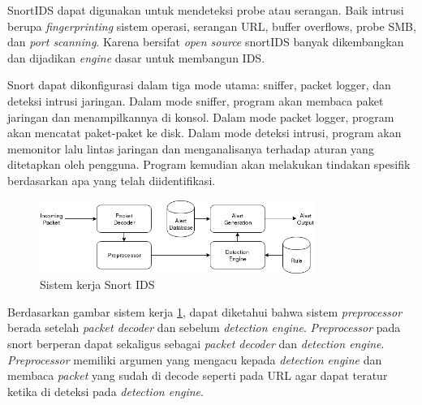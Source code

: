 \documentclass[./skripsi.tex]{subfiles}
\begin{document}
\par SnortIDS dapat digunakan untuk mendeteksi probe atau serangan. Baik intrusi berupa \textit{fingerprinting} sistem operasi,  serangan URL, buffer overflows, probe SMB, dan \textit{port scanning}. Karena bersifat \textit{open source} snortIDS banyak dikembangkan dan dijadikan \textit{engine} dasar untuk membangun IDS. \cite{stanger2011cheat}

\par Snort dapat dikonfigurasi dalam tiga mode utama: sniffer, packet logger, dan deteksi intrusi jaringan. Dalam mode sniffer, program akan membaca paket jaringan dan menampilkannya di konsol. Dalam mode packet logger, program akan mencatat paket-paket ke disk. Dalam mode deteksi intrusi, program akan memonitor lalu lintas jaringan dan menganalisanya terhadap aturan yang ditetapkan oleh pengguna. Program kemudian akan melakukan tindakan spesifik berdasarkan apa yang telah diidentifikasi.
\begin{figure}%
    \centering
    \includegraphics[width=0.8\textwidth]{public/assets/img/SnortIDS.png}
    \caption{Sistem kerja Snort IDS}
    \label{fig:sissnort}
\end{figure}
\par Berdasarkan gambar sistem kerja \ref{fig:sissnort}, dapat diketahui bahwa sistem \textit{preprocessor} berada setelah \textit{packet decoder} dan sebelum \textit{detection engine}. \textit{Preprocessor} pada snort berperan dapat sekaligus sebagai \textit{packet decoder} dan \textit{detection engine}. \textit{Preprocessor} memiliki argumen yang mengacu kepada \textit{detection engine} dan membaca \textit{packet} yang sudah di decode seperti pada URL agar dapat teratur ketika di deteksi pada \textit{detection engine}.
\end{document}
